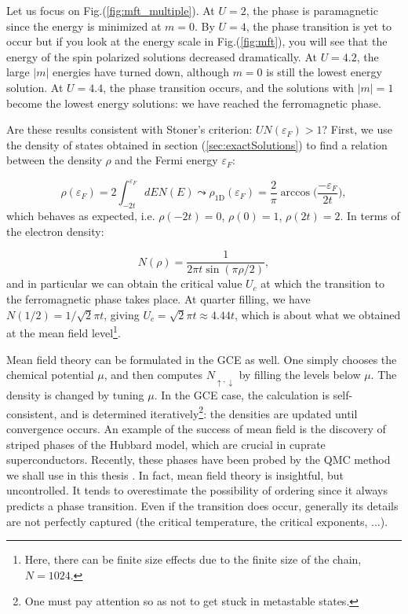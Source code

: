 Let us focus on Fig.(\ref{fig:mft_multiple}).
At $U = 2$, the phase is paramagnetic since the energy is minimized at $m = 0$. By $U = 4$, the phase transition is yet to occur but if you look at the energy scale in Fig.(\ref{fig:mft}), you will see that the energy of the spin polarized solutions decreased dramatically.
	At $U = 4.2$, the large $| m | $ energies have turned down, although $m = 0$ is still the lowest energy solution.
	At $U = 4.4$, the phase transition occurs, and the solutions with $| m | = 1$ become the lowest energy solutions: we have reached the ferromagnetic phase.

Are these results consistent with Stoner's criterion: $U N ( \varepsilon_F ) > 1$?
First, we use the density of states obtained in section (\ref{sec:exactSolutions}) to find a relation between the density $\rho$ and the Fermi energy $\varepsilon_F$:

\begin{equation}
\rho ( \varepsilon_F ) = 2 \int_{-2t}^{\varepsilon_F} dE N ( E ) \leadsto \rho_{\text{1D}} ( \varepsilon_F ) = \frac{2}{\pi} \arccos\bigg( \frac{-\varepsilon_F}{2t}\bigg) ,
\end{equation}
which behaves as expected, i.e. $\rho ( -2 t ) = 0$,  $\rho ( 0 ) = 1$, $\rho ( 2 t ) = 2$.
In terms of the electron density:

\begin{equation}
N ( \rho ) = \frac{1}{2\pi t \sin(\pi \rho / 2)} ,
\end{equation}
and in particular we can obtain the critical value $U_c$ at which the transition to the ferromagnetic phase takes place.
At quarter filling, we have $N( 1 / 2 ) = 1 /\sqrt{2} \pi t$, giving $U_c = \sqrt{2} \pi t \approx 4.44 t$, which is about what we obtained at the mean field level\footnote{Here, there can be finite size effects due to the finite size of the chain, $N = 1024$.}.

Mean field theory can be formulated in the \ac{GCE} as well.
One simply chooses the chemical potential $\mu$, and then computes $N_{\uparrow, \downarrow}$ by filling the levels below $\mu$.
The density is changed by tuning $\mu$.
In the \ac{GCE} case, the calculation is self-consistent, and is determined iteratively\footnote{One must pay attention so as not to get stuck in metastable states.}: the densities are updated until convergence occurs.
An example of the success of mean field is the discovery of striped phases of the Hubbard model, which are crucial in cuprate superconductors.
Recently, these phases have been probed by the \ac{QMC} method we shall use in this thesis \cite{huang_stripe_2018}.
In fact, mean field theory is insightful, but uncontrolled.
It tends to overestimate the possibility of ordering since it always predicts a phase transition.
Even if the transition does occur, generally its details are not perfectly captured (the critical temperature, the critical exponents, ...).

